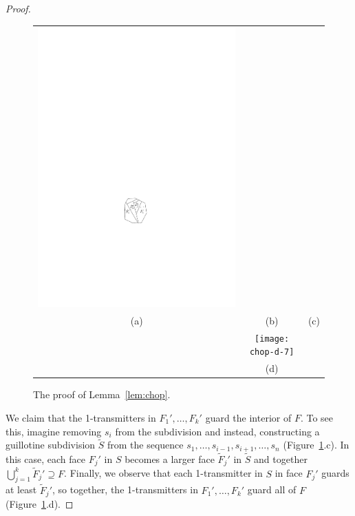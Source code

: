 \documentclass{article}
\begin{document}
\begin{proof}
\begin{figure}
\begin{center}
\begin{tabular}{ccc}
      \includegraphics{chop-c}  \\  
      (a) & (b) & (c) \\[1ex]
      & \texttt{[image: chop-d-7]} &  \\  
      & (d) &  \\  
    \end{tabular}
  \end{center}
  \caption{The proof of Lemma~\ref{lem:chop}.}
  \label{fig:chop}
\end{figure}

We claim that the 1-transmitters in $F_1',\ldots,F_k'$ guard the interior
of $F$.  To see this, imagine removing $s_i$ from the subdivision and
instead, constructing a guillotine subdivision $\tilde{S}$ from the sequence
$s_1,\ldots,s_{i-1},s_{i+1},\ldots,s_n$ (Figure~\ref{fig:chop}.c).
In this case, each face $F_j'$ in $S$ becomes a larger face $\tilde F_j'$
in $\tilde{S}$ and together $\bigcup_{j=1}^k \tilde F_j'\supseteq F$.  Finally,
we observe that each 1-transmitter in $S$ in face $F_j'$ guards at least
$\tilde F_j'$, so together, the 1-transmitters in $F_1',\ldots,F_k'$
guard all of $F$ (Figure~\ref{fig:chop}.d).
\end{proof}
\end{document}
